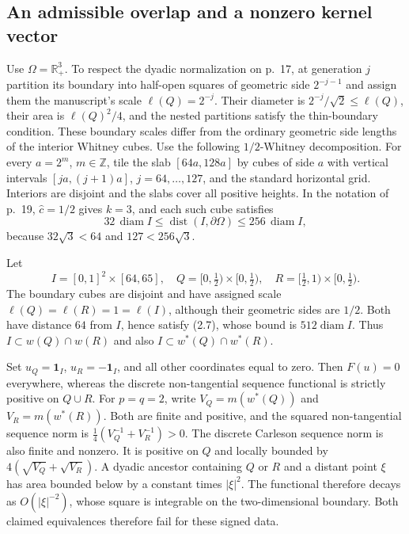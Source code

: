 \documentclass[10pt]{article}
\begin{document}
\subsection*{An admissible overlap and a nonzero kernel vector}
Use \(\Omega=\mathbb R^3_+\). To respect the dyadic normalization on p. 17, at generation \(j\) partition its boundary into half-open squares of geometric side \(2^{-j-1}\) and assign them the manuscript’s scale \(\ell(Q)=2^{-j}\). Their diameter is \(2^{-j}/\sqrt2\leq\ell(Q)\), their area is \(\ell(Q)^2/4\), and the nested partitions satisfy the thin-boundary condition. These boundary scales differ from the ordinary geometric side lengths of the interior Whitney cubes. Use the following \(1/2\)-Whitney decomposition. For every \(a=2^m\), \(m\in\mathbb Z\), tile the slab \([64a,128a]\) by cubes of side \(a\) with vertical intervals \([ja,(j+1)a]\), \(j=64,\ldots,127\), and the standard horizontal grid. Interiors are disjoint and the slabs cover all positive heights. In the notation of p. 19, \(\widehat c=1/2\) gives \(k=3\), and each such cube satisfies \[32\,\operatorname{diam}I
 \leq\mathop{\mathrm{dist}}(I,\partial\Omega)
 \leq256\,\operatorname{diam}I,\] because \(32\sqrt3<64\) and \(127<256\sqrt3\).\par
Let \[I=[0,1]^2\times[64,65],\quad
 Q=[0,\tfrac12)\times[0,\tfrac12),\quad
R=[\tfrac12,1)\times[0,\tfrac12).\] The boundary cubes are disjoint and have assigned scale \(\ell(Q)=\ell(R)=1=\ell(I)\), although their geometric sides are \(1/2\). Both have distance \(64\) from \(I\), hence satisfy (2.7), whose bound is \(512\operatorname{diam}I\). Thus \(I\subset w(Q)\cap w(R)\) and also \(I\subset w^*(Q)\cap w^*(R)\).\par
Set \(u_Q=\mathbf1_I\), \(u_R=-\mathbf1_I\), and all other coordinates equal to zero. Then \(F(u)=0\) everywhere, whereas the discrete non-tangential sequence functional is strictly positive on \(Q\cup R\). For \(p=q=2\), write \(V_Q=m(w^*(Q))\) and \(V_R=m(w^*(R))\). Both are finite and positive, and the squared non-tangential sequence norm is \(\tfrac14(V_Q^{-1}+V_R^{-1})>0\). The discrete Carleson sequence norm is also finite and nonzero. It is positive on \(Q\) and locally bounded by \(4(\sqrt{V_Q}+\sqrt{V_R})\). A dyadic ancestor containing \(Q\) or \(R\) and a distant point \(\xi\) has area bounded below by a constant times \(|\xi|^2\). The functional therefore decays as \(O(|\xi|^{-2})\), whose square is integrable on the two-dimensional boundary. Both claimed equivalences therefore fail for these signed data.\par
\end{document}
